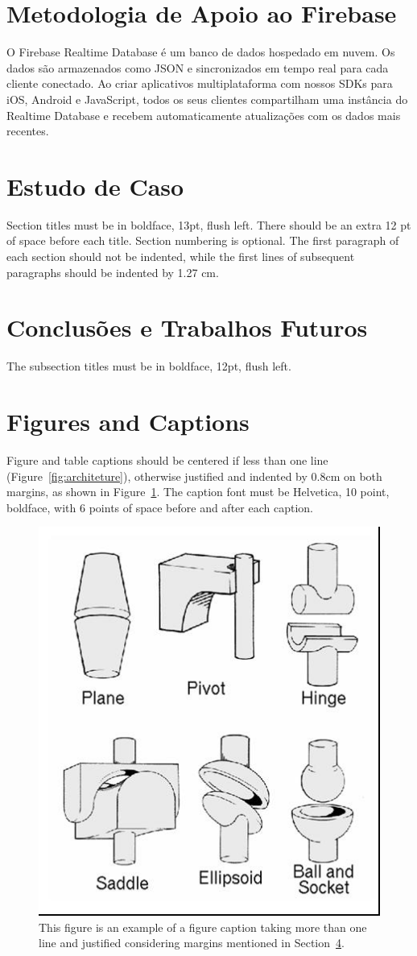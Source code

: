 \documentclass[12pt]{article}
\begin{document}
\section{Metodologia de Apoio ao Firebase}

O Firebase Realtime Database é um banco de dados hospedado em nuvem. Os dados são armazenados como JSON e sincronizados em tempo real para cada cliente conectado. Ao criar aplicativos multiplataforma com nossos SDKs para iOS, Android e JavaScript, todos os seus clientes compartilham uma instância do Realtime Database e recebem automaticamente atualizações com os dados mais recentes. \cite{Firebase}

\section{Estudo de Caso}

Section titles must be in boldface, 13pt, flush left. There should be an extra
12 pt of space before each title. Section numbering is optional. The first
paragraph of each section should not be indented, while the first lines of
subsequent paragraphs should be indented by 1.27 cm.

\section{Conclusões e Trabalhos Futuros}

The subsection titles must be in boldface, 12pt, flush left.

\section{Figures and Captions}\label{sec:figs}


Figure and table captions should be centered if less than one line
(Figure~\ref{fig:architeture}), otherwise justified and indented by 0.8cm on
both margins, as shown in Figure~\ref{fig:exampleFig2}. The caption font must
be Helvetica, 10 point, boldface, with 6 points of space before and after each
caption.

\begin{figure}[ht]
\centering
\includegraphics[width=.3\textwidth]{fig2.jpg}
\caption{This figure is an example of a figure caption taking more than one
  line and justified considering margins mentioned in Section~\ref{sec:figs}.}
\label{fig:exampleFig2}
\end{figure}
\end{document}
